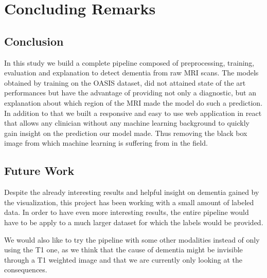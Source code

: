 \chapter{Concluding Remarks}

\section{Conclusion}
In this study we build a complete pipeline composed of preprocessing, training, evaluation and explanation to detect dementia from raw MRI scans. The models obtained by training on the OASIS dataset, did not attained state of the art performances but have the advantage of providing not only a diagnostic, but an explanation about which region of the MRI made the model do such a prediction. In addition to that we built a responsive and easy to use web application in react\footnotemark{} that allows any clinician without any machine learning background to quickly gain insight on the prediction our model made. Thus removing the black box image from which machine learning is suffering from in the field.  

\section{Future Work}
Despite the already interesting results and helpful insight on dementia gained by the visualization, this project has been working with a small amount of labeled data. In order to have even more interesting results, the entire pipeline would have to be apply to a much larger dataset for which the labels would be provided.

We would also like to try the pipeline with some other modalities instead of only using the T1 one, as we think that the cause of dementia might be invisible through a T1 weighted image and that we are currently only looking at the consequences.